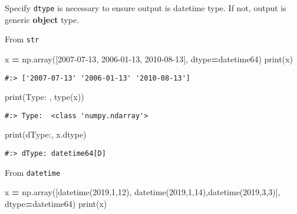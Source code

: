 \documentclass[
]{book}
\newenvironment{Shaded}{\begin{snugshade}}{\end{snugshade}}
\newcommand{\BuiltInTok}[1]{#1}
\newcommand{\DecValTok}[1]{\textcolor[rgb]{0.06,0.06,0.06}{#1}}
\newcommand{\NormalTok}[1]{#1}
\newcommand{\OperatorTok}[1]{\textcolor[rgb]{0.43,0.43,0.43}{\textbf{#1}}}
\newcommand{\StringTok}[1]{\textcolor[rgb]{0.5,0.5,0.5}{#1}}
\begin{document}
Specify \texttt{dtype} is necessary to ensure output is datetime type. If not, output is generic \textbf{object} type.

From \texttt{str}

\begin{Shaded}
\begin{Highlighting}[]
\NormalTok{x }\OperatorTok{=}\NormalTok{ np.array([}\StringTok{\textquotesingle{}2007{-}07{-}13\textquotesingle{}}\NormalTok{, }\StringTok{\textquotesingle{}2006{-}01{-}13\textquotesingle{}}\NormalTok{, }\StringTok{\textquotesingle{}2010{-}08{-}13\textquotesingle{}}\NormalTok{], dtype}\OperatorTok{=}\StringTok{\textquotesingle{}datetime64\textquotesingle{}}\NormalTok{)}
\BuiltInTok{print}\NormalTok{(x)}
\end{Highlighting}
\end{Shaded}

\begin{verbatim}
#:> ['2007-07-13' '2006-01-13' '2010-08-13']
\end{verbatim}

\begin{Shaded}
\begin{Highlighting}[]
\BuiltInTok{print}\NormalTok{(}\StringTok{\textquotesingle{}Type: \textquotesingle{}}\NormalTok{, }\BuiltInTok{type}\NormalTok{(x))}
\end{Highlighting}
\end{Shaded}

\begin{verbatim}
#:> Type:  <class 'numpy.ndarray'>
\end{verbatim}

\begin{Shaded}
\begin{Highlighting}[]
\BuiltInTok{print}\NormalTok{(}\StringTok{\textquotesingle{}dType:\textquotesingle{}}\NormalTok{, x.dtype)}
\end{Highlighting}
\end{Shaded}

\begin{verbatim}
#:> dType: datetime64[D]
\end{verbatim}

From \texttt{datetime}

\begin{Shaded}
\begin{Highlighting}[]
\NormalTok{x }\OperatorTok{=}\NormalTok{ np.array([datetime(}\DecValTok{2019}\NormalTok{,}\DecValTok{1}\NormalTok{,}\DecValTok{12}\NormalTok{), datetime(}\DecValTok{2019}\NormalTok{,}\DecValTok{1}\NormalTok{,}\DecValTok{14}\NormalTok{),datetime(}\DecValTok{2019}\NormalTok{,}\DecValTok{3}\NormalTok{,}\DecValTok{3}\NormalTok{)], dtype}\OperatorTok{=}\StringTok{\textquotesingle{}datetime64\textquotesingle{}}\NormalTok{)}
\BuiltInTok{print}\NormalTok{(x)}
\end{Highlighting}
\end{Shaded}
\end{document}
